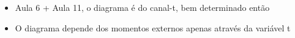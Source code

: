 \begin{itemize}
    \item Aula 6 + Aula 11, o diagrama é do canal-t, bem determinado então
    \item O diagrama depende dos momentos externos apenas através da variável t
\end{itemize}